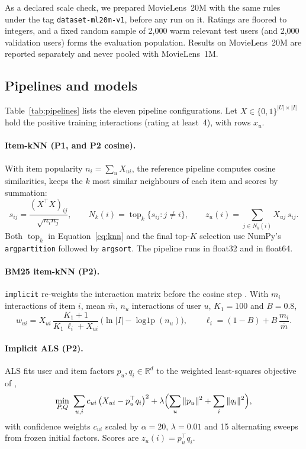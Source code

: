 \documentclass[11pt,a4paper]{article}
\DeclareMathOperator{\topk}{top}
\newcommand{\T}{^{\top}}
\begin{document}
As a declared scale check, we prepared MovieLens~20M with the same rules
under the tag \texttt{dataset-ml20m-v1}, before any run on it. Ratings are
floored to integers, and a fixed random sample of 2{,}000 warm relevant test
users (and 2{,}000 validation users) forms the evaluation population. Results on
MovieLens~20M are reported separately and never pooled with MovieLens~1M.

\subsection{Pipelines and models}
\label{sec:models}
Table~\ref{tab:pipelines} lists the eleven pipeline configurations. Let
$X\in\{0,1\}^{|U|\times|I|}$ hold the positive training interactions
(rating at least~4), with rows $x_u$.

\paragraph{Item-kNN (P1, and P2 cosine).} With item popularity
$n_i=\sum_u X_{ui}$, the reference pipeline \citep{sarwar2001itembased}
computes cosine similarities, keeps the $k$ most similar neighbours of each
item and scores by summation:
\begin{equation}
 s_{ij}=\frac{(X\T X)_{ij}}{\sqrt{n_i n_j}},\qquad
 N_k(i)=\topk_k\{s_{ij}: j\neq i\},\qquad
 z_u(i)=\sum_{j\in N_k(i)} X_{uj}\,s_{ij}.
 \label{eq:knn}
\end{equation}
Both $\topk_k$ in Equation~\eqref{eq:knn} and the final top-$K$ selection use
NumPy's \texttt{argpartition} followed by \texttt{argsort}. The pipeline runs
in float32 and in float64.

\paragraph{BM25 item-kNN (P2).} \texttt{implicit} re-weights the interaction
matrix before the cosine step \citep{robertson2009bm25}. With $m_i$
interactions of item $i$, mean $\bar m$, $n_u$ interactions of user $u$,
$K_1=100$ and $B=0.8$,
\begin{equation}
 w_{ui}=X_{ui}\,\frac{K_1+1}{K_1\,\ell_i+X_{ui}}\,
        \bigl(\ln|I|-\operatorname{log1p}(n_u)\bigr),\qquad
 \ell_i=(1-B)+B\,\frac{m_i}{\bar m}.
 \label{eq:bm25}
\end{equation}

\paragraph{Implicit ALS (P2).} ALS fits user and item factors $p_u,q_i\in
\mathbb{R}^d$ to the weighted least-squares objective of
\citet{hu2008implicit},
\begin{equation}
 \min_{P,Q}\ \sum_{u,i} c_{ui}\,\bigl(X_{ui}-p_u\T q_i\bigr)^2
 +\lambda\Bigl(\sum_u\|p_u\|^2+\sum_i\|q_i\|^2\Bigr),
 \label{eq:als}
\end{equation}
with confidence weights $c_{ui}$ scaled by $\alpha=20$, $\lambda=0.01$ and 15
alternating sweeps from frozen initial factors. Scores are $z_u(i)=p_u\T q_i$.
\end{document}
